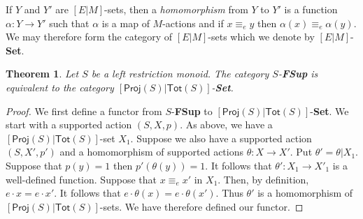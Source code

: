 \documentclass[a4paper]{amsart}
\newtheorem{theorem}{Theorem}[section]
\begin{document}
If $Y$ and $Y'$ are $[E|M]$-sets, then a {\em homomorphism} from $Y$ to $Y'$ is a function $\alpha \colon Y \rightarrow Y'$
such that $\alpha$ is a map of $M$-actions and if $x \equiv_{e} y$ then $\alpha(x) \equiv_{e} \alpha (y)$.
We may therefore form the category of $[E|M]$-sets which we denote by $[E|M]$-{\bf Set}.

\begin{theorem}\label{them:mary} Let $S$ be a left restriction monoid.  
The category $S$-{\bf FSup} is equivalent to the category $[\mathsf{Proj}(S)|\mathsf{Tot}(S)]$-{\bf Set}.
\end{theorem}
\begin{proof} 
We first define a functor from $S$-{\bf FSup} to $[\mathsf{Proj}(S)|\mathsf{Tot}(S)]$-{\bf Set}.
We start with a supported action $(S,X,p)$.
As above, we have a $[\mathsf{Proj}(S)|\mathsf{Tot}(S)]$-set $X_{1}$.
Suppose we also have a supported action $(S,X',p')$ and a homomorphism of supported actions $\theta \colon X \rightarrow X'$.
Put $\theta' = \theta | X_{1}$.
Suppose that $p(y) = 1$ then $p' (\theta (y)) = 1$.
It follows that $\theta' \colon X_{1} \rightarrow X'_{1}$ is a well-defined function.
Suppose that $x \equiv_{e} x'$ in $X_{1}$.
Then, by definition, $e \cdot x = e \cdot x'$.
It follows that $e \cdot \theta (x) = e \cdot \theta (x')$.
Thus $\theta'$ is a homomorphism of $[\mathsf{Proj}(S)|\mathsf{Tot}(S)]$-sets.
We have therefore defined our functor.


\end{proof}
\end{document}
